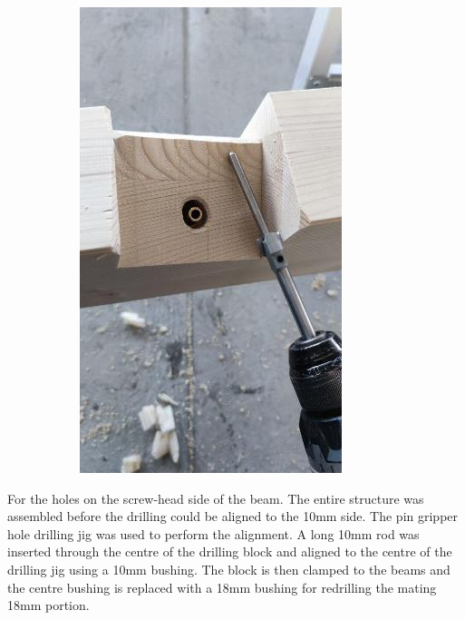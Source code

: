 \documentclass[11pt]{book}
\begin{document}
\begin{figure}[H]
\begin{subfigure}[b]{0.45\textwidth}
\includegraphics[width=\textwidth]{./images/image91.jpeg}
\end{subfigure}
\end{figure}


For the holes on the screw-head side of the beam. The entire structure was assembled before the drilling could be aligned to the 10mm side. The pin gripper hole drilling jig was used to perform the alignment. A long 10mm rod was inserted through the centre of the drilling block and aligned to the centre of the drilling jig using a 10mm bushing. The block is then clamped to the beams and the centre bushing is replaced with a 18mm bushing for redrilling the mating 18mm portion. 
\end{document}
